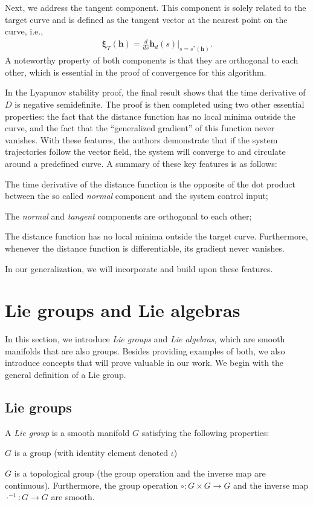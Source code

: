 Next, we address the tangent component. This component is solely related to the target curve and is defined as the tangent vector at the nearest point on the curve, i.e.,
\begin{align}
    \boldsymbol{\xi}_{T}(\mathbf{h}) = \frac{d}{ds}\mathbf{h}_d(s)|_{s=s^*(\mathbf{h})}.
\end{align}
A noteworthy property of both components is that they are orthogonal to each other, which is essential in the proof of convergence for this algorithm.

In the Lyapunov stability proof, the final result shows that the time derivative of $D$ is negative semidefinite. The proof is then completed using two other essential properties: the fact that the distance function has no local minima outside the curve, and the fact that the ``generalized gradient'' of this function never vanishes. With these features, the authors demonstrate that if the system trajectories follow the vector field, the system will converge to and circulate around a predefined curve. A summary of these key features is as follows:
\begin{feature}
    \item The time derivative of the distance function is the opposite of the dot product between the so called \emph{normal} component and the system control input; \label{feat:adriano-time-derivative-lyapunov-normal-comp}
    \item The \emph{normal} and \emph{tangent} components are orthogonal to each other; \label{feat:adriano-orthogonality}
    \item The distance function has no local minima outside the target curve. Furthermore, whenever the distance function is differentiable, its gradient never vanishes. \label{feat:adriano-no-local-minima}
\end{feature}
In our generalization, we will incorporate and build upon these features.

\section{Lie groups and Lie algebras}
In this section, we introduce \emph{Lie groups} and \emph{Lie algebras}, which are smooth manifolds that are also groups. Besides providing examples of both, we also introduce concepts that will prove valuable in our work. We begin with the general definition of a Lie group.
\subsection{Lie groups}
\begin{definition}
    A \emph{Lie group} is a smooth manifold $G$ satisfying the following properties:
    \begin{property}
        \item $G$ is a group (with identity element denoted $\iota$)
        \item $G$ is a topological group (the group operation and the inverse map are continuous). Furthermore, the group operation $\circ: G\times G\to G$ and the inverse map $\cdot^{-1}: G\to G$ are smooth.
    \end{property}
\end{definition}

